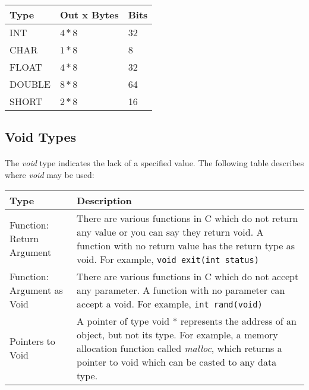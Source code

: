 \begin{center}
   \begin{tabular}{ || p{1in} | p{2in} | p{2in} || }
   \hline
   \textbf{Type} & \textbf{Out x Bytes} & \textbf{Bits} \\ [0.75ex]
   \hline\hline
   INT & \(4 * 8\) & 32 \\
   \hline
   CHAR & \(1 * 8\) & 8 \\
   \hline
   FLOAT & \(4 * 8\) & 32 \\
   \hline
   DOUBLE & \(8 * 8\) & 64 \\
   \hline
   SHORT & \(2 * 8\) & 16 \\
   \hline
   \end{tabular}
\end{center}

\newpage

\subsection{Void Types}
   \paragraph{}
      The \textit{void} type indicates the lack of a specified value. The following table describes where \textit{void} may be used:
      \begin{center}
         \begin{tabular}{ || p{2in} | p{4in} || }
         \hline
         \textbf{Type} & \textbf{Description} \\ [1ex]
         \hline\hline
         Function: Return Argument & There are various functions in C which do not return any value or you can say they return void. A function with
         no return value has the return type as void. For example, \verb;void exit(int status); \\ [0.4ex]
         \hline
         Function: Argument as Void & There are various functions in C which do not accept any parameter. A function with no parameter can accept a
         void. For example, \verb;int rand(void); \\ [0.6ex]
         \hline
         Pointers to Void & A pointer of type void * represents the address of an object, but not its type. For example, a memory allocation function 
         called \textit{malloc}, which returns a pointer to void which can be casted to any data type. \\ [0.4ex]
         \hline
         \end{tabular}
      \end{center}

